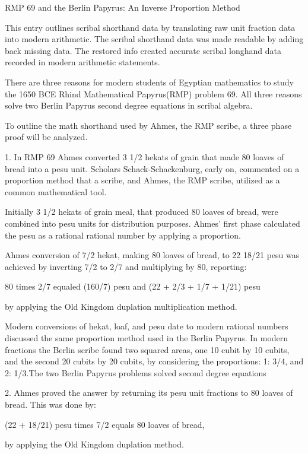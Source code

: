 \documentclass[12pt]{article}
\begin{document}
RMP 69 and the Berlin Papyrus: An Inverse Proportion Method

This entry outlines scribal shorthand data by translating raw unit fraction data into modern arithmetic.  The scribal shorthand data was made readable by adding back missing data. The restored info created accurate scribal longhand data recorded in modern arithmetic statements.

There are three reasons for modern students of Egyptian mathematics to study the 1650 BCE Rhind Mathematical Papyrus(RMP) problem 69. All three reasons solve two Berlin Papyrus second degree equations in scribal algebra.  

To outline the math shorthand used by Ahmes, the RMP scribe, a three phase proof will be analyzed. 

1. In RMP 69 Ahmes converted 3 1/2 hekats of grain that made 80 loaves of bread into a pesu unit. Scholars Schack-Schackenburg, early on, commented on a proportion method that a  scribe, and Ahmes, the RMP scribe, utilized as a common mathematical tool. 

Initially 3 1/2 hekats of grain meal, that produced 80 loaves of bread, were combined into pesu units for distribution purposes. Ahmes' first phase calculated the pesu as a rational rational number by applying a proportion.

Ahmes conversion of 7/2 hekat, making 80 loaves of bread, to 22 18/21 pesu was achieved by inverting 7/2 to 2/7 and multiplying by 80, reporting:

80 times 2/7 equaled (160/7) pesu and (22 + 2/3 + 1/7 + 1/21) pesu

by applying the Old Kingdom duplation multiplication method.

Modern conversions of hekat, loaf, and pesu date to modern rational numbers discussed the same proportion method used in the Berlin Papyrus. In modern fractions the Berlin scribe found two squared areas, one 10 cubit by 10 cubits, and the second 20 cubits by 20 cubits, by considering the proportions: 1: 3/4, and 2: 1/3.The two Berlin Papyrus problems solved second degree equations

2. Ahmes proved the answer by returning its pesu unit fractions to 80 loaves of bread. This was done by:

(22 + 18/21) pesu times 7/2 equals 80 loaves of bread,

by applying the Old Kingdom duplation method.
\end{document}
